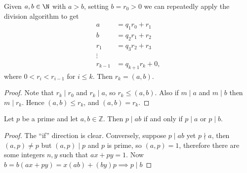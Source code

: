\documentclass[a4paper, 10pt]{amsart}
\begin{document}



\begin{theorem}
Given $a, b\in \N$ with $a > b$, setting $b = r_0>0$ we can repeatedly apply the division algorithm to get
\begin{align*}
  a &= q_1 r_0 + r_1 \\
  b &= q_2 r_1 + r_2 \\
  r_1 &= q_3 r_2 + r_3 \\
  \vdots \\
  r_{k-1} &= q_{k+1} r_{k} + 0,
\end{align*}
where $0 < r_i < r_{i - 1}$ for $i \leq k$.
Then $r_k = (a, b)$.
\end{theorem}
\begin{proof}
  Note that $r_k \mid r_0$ and $r_k \mid a$, so $r_k \leq (a, b)$. Also if $m \mid a$ and $m \mid b$ then $m\mid r_k$. Hence $(a, b) \leq r_k$, and $(a, b) = r_k$.
\end{proof}

\begin{lemma}
  Let $p$ be a prime and let $a, b\in \mathbb{Z}$. Then $p \mid ab$ if and only if $p \mid a$ or $p \mid b$.
\end{lemma}
\begin{proof}
  The ``if'' direction is clear. Conversely, suppose $p \mid a b$ yet $p \nmid a$, then $(a, p) \neq p$ but $(a, p) \mid p$ and $p$ is prime, so $(a, p)=1$, therefore there are some integers $n, y$ such that $a x+p y=1$. Now $b=b(a x+p y)=x(a b)+(b y) p \implies p \mid b$
\end{proof}
\end{document}
